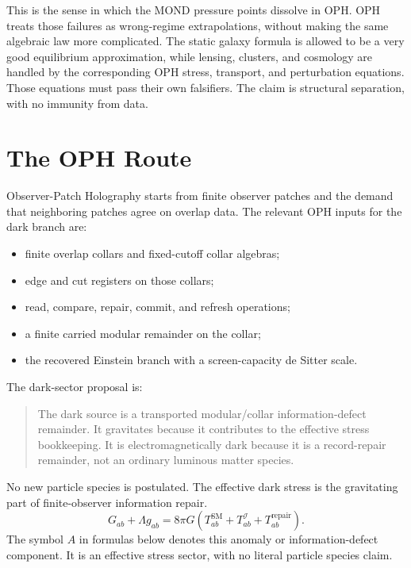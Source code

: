 \documentclass[11pt]{article}
\begin{document}
This is the sense in which the MOND pressure points dissolve in OPH.  OPH
treats those failures as wrong-regime extrapolations, without making the same
algebraic law more complicated.  The static galaxy formula is allowed to be a
very good equilibrium approximation, while lensing, clusters, and cosmology are
handled by the corresponding OPH stress, transport, and perturbation equations.
Those equations must pass their own falsifiers.  The claim is structural
separation, with no immunity from data.

\section{The OPH Route}

Observer-Patch Holography starts from finite observer patches and the demand
that neighboring patches agree on overlap data.  The relevant OPH inputs for
the dark branch are:

\begin{itemize}
\item finite overlap collars and fixed-cutoff collar algebras;
\item edge and cut registers on those collars;
\item read, compare, repair, commit, and refresh operations;
\item a finite carried modular remainder on the collar;
\item the recovered Einstein branch with a screen-capacity de Sitter scale.
\end{itemize}

The dark-sector proposal is:
\begin{quote}
The dark source is a transported modular/collar information-defect remainder.  It
gravitates because it contributes to the effective stress bookkeeping.  It is
electromagnetically dark because it is a record-repair remainder, not an
ordinary luminous matter species.
\end{quote}
No new particle species is postulated.  The effective dark stress is the
gravitating part of finite-observer information repair.
\begin{equation}
  G_{ab}+\Lambda g_{ab}
  =
  8\pi G
  \left(
    T_{ab}^{\mathrm{SM}}
    +T_{ab}^{\mathcal I}
    +T_{ab}^{\mathrm{repair}}
  \right).
  \label{eq:informationstresssurface}
\end{equation}
The symbol \(A\) in formulas below denotes this anomaly or information-defect
component.  It is an effective stress sector, with no literal particle species
claim.
\end{document}
